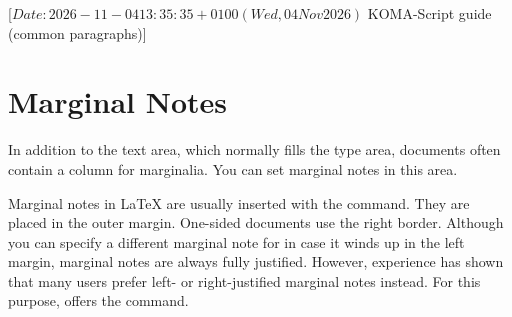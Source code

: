 %
%
%
%
%
%
%

                 [$Date: 2026-11-04 13:35:35 +0100 (Wed, 04 Nov 2026) $
                  KOMA-Script guide (common paragraphs)]

\section{Marginal Notes}
%
\BeginIndexGroup
{}%


In addition to the text area, which normally fills the type area, documents
often contain a column for marginalia. You can set marginal notes in this
area.
%


\begin{Declaration}
\end{Declaration}%
Marginal notes in {\LaTeX} are usually
inserted with the  command. They are placed in the outer
margin. One-sided documents use the right border. Although you can specify a
different marginal note for  in case it winds up in the left
margin, marginal notes are always fully justified. However, experience has
shown that many users prefer left- or right-justified marginal notes
instead. For this purpose, {\KOMAScript} offers the 
command.


